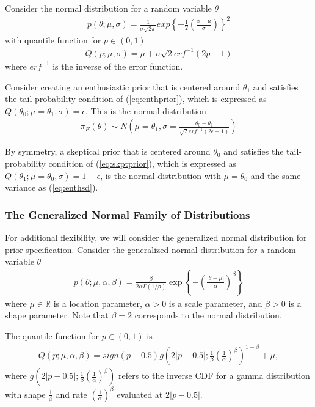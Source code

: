 \documentclass[12pt]{article}
\begin{document}
Consider the normal distribution for a random variable $\theta$
\begin{align}
p(\theta;\mu,\sigma)=\frac{1}{\sigma\sqrt{2\pi}}exp\left\{-\frac{1}{2}\left(\frac{x-\mu}{\sigma}\right)\right\}^2
\end{align}
with quantile function for $p\in(0,1)$
\begin{align}
Q(p;\mu,\sigma)=\mu+\sigma\sqrt{2}erf^{-1}(2p-1)
\end{align}
where $erf^{-1}$ is the inverse of the error function.

Consider creating an enthusiastic prior that is centered around $\theta_1$ and satisfies the tail-probability condition of (\ref{eq:enthprior}), which is expressed as $Q(\theta_0;\mu=\theta_1,\sigma)=\epsilon$. This is the normal distribution 
\begin{align}\label{eq:enthsd}
\pi_E(\theta)\sim N\left(\mu=\theta_1,\sigma=\frac{\theta_0-\theta_1}{\sqrt{2}erf^{-1}(2\epsilon-1)}\right)
\end{align}

By symmetry, a skeptical prior that is centered around $\theta_0$ and satisfies the tail-probability condition of (\ref{eq:skptprior}), which is expressed as $Q(\theta_1;\mu=\theta_0,\sigma)=1-\epsilon$, is the normal distribution with $\mu=\theta_0$ and the same variance as (\ref{eq:enthsd}).

\subsubsection{The Generalized Normal Family of Distributions}
For additional flexibility, we will consider the generalized normal distribution for prior specification. Consider the generalized normal distribution for a random variable $\theta$ 
\begin{align}\label{eq:generalizednormalkernel}
p(\theta;\mu,\alpha,\beta)=\frac{\beta}{2\alpha\Gamma(1/\beta)}\exp\left\{-\left(\frac{|\theta-\mu|}{\alpha}\right)^\beta\right\}
\end{align} where $\mu\in\mathbb{R}$ is a location parameter, $\alpha>0$ is a scale parameter, and $\beta>0$ is a shape parameter. Note that $\beta=2$ corresponds to the normal distribution. 

The quantile function for $p\in (0,1)$ is 
\begin{align}
Q(p;\mu,\alpha,\beta)=sign(p-0.5) g\left(2|p-0.5|;\frac{1}{\beta}\left(\frac{1}{\alpha}\right)^{\beta}\right)^{1-\beta}+\mu,
\end{align}
where $g\left(2|p-0.5|;\frac{1}{\beta}\left(\frac{1}{\alpha}\right)^{\beta}\right)$ refers to the inverse CDF for a gamma distribution with shape $\frac{1}{\beta}$ and rate $(\frac{1}{\alpha})^\beta$ evaluated at $2|p-0.5|$.
\end{document}
